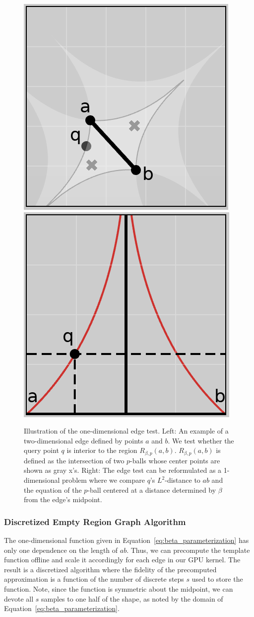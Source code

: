 \begin{figure}[!b]
    \includegraphics[width=0.48\linewidth]{figs/chap7/bskeleton.png}
    \includegraphics[width=0.48\linewidth]{figs/chap7/bskeletonParameter.png}
    \caption[Illustration of the one-dimensional edge test]{Illustration of the one-dimensional edge test. Left: An example of a two-dimensional edge defined by points $a$ and $b$.
    We test whether the query point $q$ is interior to the region $R_{\beta,p}(a,b)$.
    $R_{\beta,p}(a,b)$ is defined as the intersection of two $p$-balls whose center points are shown as gray x's.
    Right: The edge test can be reformulated as a 1-dimensional problem where we compare $q$'s $L^2$-distance to $ab$ and the equation of the $p$-ball centered at a distance determined by $\beta$ from the edge's midpoint.}
    \label{fig:beta_p_example}
\end{figure}

\subsubsection{Discretized Empty Region Graph Algorithm}
\label{sec:gpu_bp_discrete}

The one-dimensional function given in Equation~\ref{eq:beta_parameterization} has only one dependence on the length of $ab$.
%
Thus, we can precompute the template function offline and scale it accordingly for each edge in our GPU kernel.
%
The result is a discretized algorithm where the fidelity of the precomputed approximation is a function of the number of discrete steps $s$ used to store the function.
%
Note, since the function is symmetric about the midpoint, we can devote all $s$ samples to one half of the shape, as noted by the domain of Equation~\ref{eq:beta_parameterization}.

